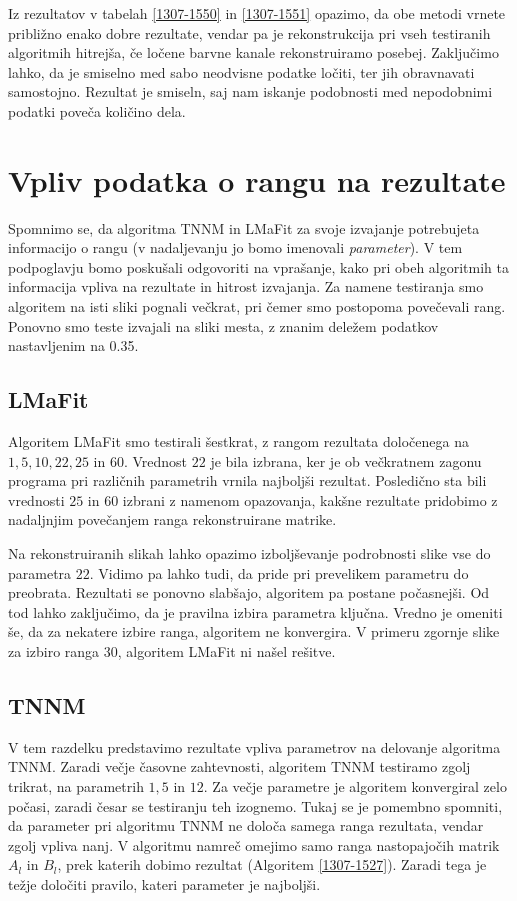 Iz rezultatov v  tabelah \ref{1307-1550} in \ref{1307-1551} opazimo, da obe metodi vrnete približno enako dobre rezultate, vendar pa je rekonstrukcija pri vseh testiranih algoritmih hitrejša, če ločene barvne kanale rekonstruiramo posebej.   Zaključimo lahko, da je smiselno med sabo neodvisne podatke ločiti, ter jih obravnavati samostojno. Rezultat je smiseln, saj nam iskanje podobnosti med nepodobnimi podatki poveča količino dela.

\section{Vpliv podatka o rangu na rezultate} \label{1307-2253}
Spomnimo se, da algoritma TNNM in LMaFit za svoje izvajanje potrebujeta informacijo o rangu (v nadaljevanju jo bomo imenovali \textit{parameter}). V tem podpoglavju bomo poskušali odgovoriti na vprašanje, kako pri obeh algoritmih ta informacija vpliva na rezultate in hitrost izvajanja. Za namene testiranja smo algoritem na isti sliki pognali večkrat, pri čemer smo postopoma povečevali rang. Ponovno smo teste izvajali na sliki mesta, z znanim deležem podatkov nastavljenim na 0.35.

\subsection{LMaFit}
Algoritem LMaFit smo testirali šestkrat, z rangom rezultata določenega na
$1, 5, 10, 22, 25$ in $60$. Vrednost $22$ je bila izbrana, ker je ob večkratnem zagonu programa pri različnih parametrih vrnila najboljši rezultat. Posledično sta bili vrednosti $25$ in $60$ izbrani z namenom opazovanja, kakšne rezultate pridobimo z nadaljnjim povečanjem ranga rekonstruirane matrike.


Na rekonstruiranih slikah lahko opazimo izboljševanje podrobnosti slike vse do parametra $22$. Vidimo pa lahko tudi, da pride pri prevelikem parametru do preobrata. Rezultati se ponovno slabšajo, algoritem pa postane počasnejši. Od tod lahko zaključimo, da je pravilna izbira parametra ključna. Vredno je omeniti še, da za nekatere izbire ranga, algoritem ne konvergira. V primeru zgornje slike za izbiro ranga $30$, algoritem LMaFit ni našel rešitve.

\subsection{TNNM}
V tem razdelku predstavimo rezultate vpliva parametrov na delovanje algoritma TNNM. Zaradi večje časovne zahtevnosti, algoritem TNNM testiramo zgolj trikrat, na parametrih $1, 5$ in $12$. Za večje parametre je algoritem konvergiral zelo počasi, zaradi česar se testiranju teh izognemo. Tukaj se je pomembno spomniti, da parameter pri algoritmu TNNM ne določa samega ranga rezultata, vendar zgolj vpliva nanj.
V algoritmu namreč omejimo samo ranga nastopajočih matrik $A_l$ in $B_l$, prek katerih dobimo rezultat (Algoritem \ref{1307-1527}). Zaradi tega je težje določiti pravilo, kateri parameter je najboljši.

\FloatBarrier


